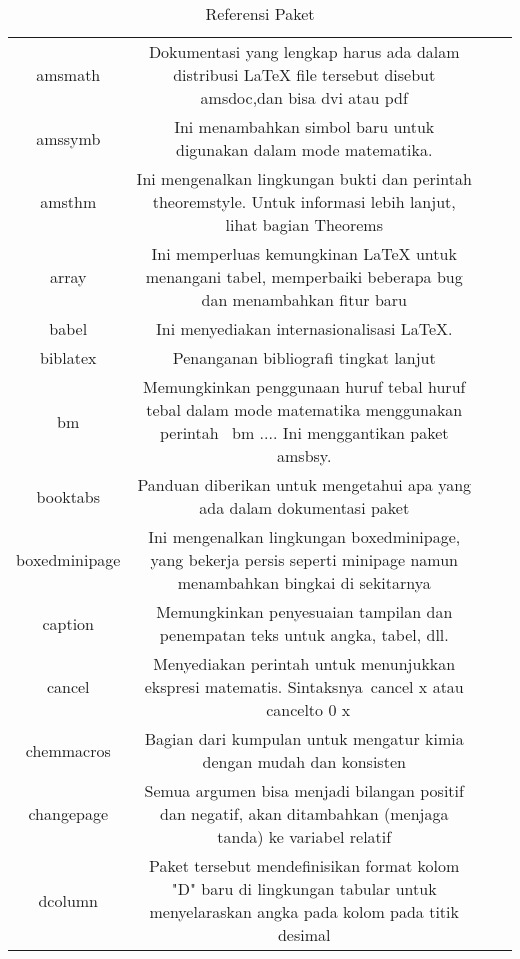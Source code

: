 \begin{table}[ht]
	\caption{Referensi Paket}
	\centering
	\begin{tabular}{cccc}
		\hline
		amsmath&Dokumentasi yang lengkap harus ada dalam distribusi LaTeX file tersebut disebut amsdoc,dan bisa dvi atau pdf&\\
		amssymb&Ini menambahkan simbol baru untuk digunakan dalam mode matematika.&\\
		amsthm&Ini mengenalkan lingkungan bukti dan perintah theoremstyle. Untuk informasi lebih lanjut, lihat bagian Theorems&\\
		array&Ini memperluas kemungkinan LaTeX untuk menangani tabel, memperbaiki beberapa bug dan menambahkan fitur baru&\\
		babel&Ini menyediakan internasionalisasi LaTeX. &\\
		biblatex&Penanganan bibliografi tingkat lanjut&\\
		bm&Memungkinkan penggunaan huruf tebal huruf tebal dalam mode matematika menggunakan perintah \ bm {...}. Ini menggantikan paket amsbsy.&\\
		booktabs&Panduan diberikan untuk mengetahui apa yang ada dalam dokumentasi paket&\\
		boxedminipage&Ini mengenalkan lingkungan boxedminipage, yang bekerja persis seperti minipage namun menambahkan bingkai di sekitarnya&\\
		caption&Memungkinkan penyesuaian tampilan dan penempatan teks untuk angka, tabel, dll.&\\
		cancel&Menyediakan perintah untuk menunjukkan ekspresi matematis. Sintaksnya\ cancel {x} atau \ cancelto {0} {x}&\\
		chemmacros&Bagian dari kumpulan untuk mengatur kimia dengan mudah dan konsisten&\\
		changepage&Semua argumen bisa menjadi bilangan positif dan negatif, akan ditambahkan (menjaga tanda) ke variabel relatif&\\
		dcolumn&Paket tersebut mendefinisikan format kolom "D" baru di lingkungan tabular untuk menyelaraskan angka pada kolom pada titik desimal&\\
	\end{tabular}
\end{table}

